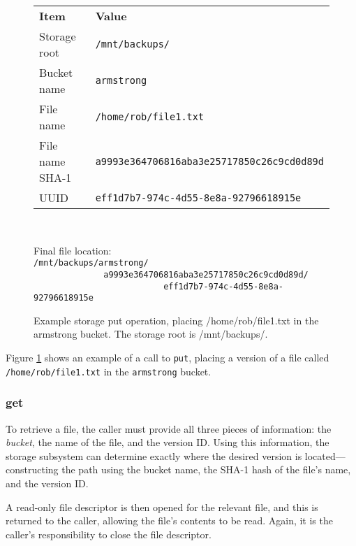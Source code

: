 \begin{figure}
    \begin{center}
        \begin{tabular}{l l}
            \textbf{Item}   & \textbf{Value}                                 \\
            Storage root    & \verb!/mnt/backups/!                           \\
            Bucket name     & \verb!armstrong!                               \\
            File name       & \verb!/home/rob/file1.txt!                     \\
            File name SHA-1 & \verb!a9993e364706816aba3e25717850c26c9cd0d89d!\\
            UUID            & \verb!eff1d7b7-974c-4d55-8e8a-92796618915e!    \\
        \end{tabular} \\
    \end{center}
        Final file location: \\
        \verb!/mnt/backups/armstrong/! \\
        \verb!              a9993e364706816aba3e25717850c26c9cd0d89d/! \\
        \verb!                          eff1d7b7-974c-4d55-8e8a-92796618915e!
    \caption{Example storage put operation, placing /home/rob/file1.txt in the
    armstrong bucket. The storage root is /mnt/backups/.}
    \label{fig:storage-put-example}
\end{figure}

Figure \ref{fig:storage-put-example} shows an example of a call to \verb!put!,
placing a version of a file called \verb!/home/rob/file1.txt! in the
\verb!armstrong! bucket.

\subsubsection{get}
\label{sec:implementation-server-storage-get}

To retrieve a file, the caller must provide all three pieces of information:
the \emph{bucket}, the name of the file, and the version ID. Using this
information, the storage subsystem can determine exactly where the desired
version is located---constructing the path using the bucket name, the SHA-1
hash of the file's name, and the version ID.

A read-only file descriptor is then opened for the relevant file, and this is
returned to the caller, allowing the file's contents to be read. Again, it is
the caller's responsibility to close the file descriptor.

